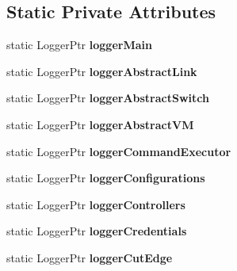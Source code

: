 \subsection*{\-Static \-Private \-Attributes}
\begin{DoxyCompactItemize}
\item 
\hypertarget{classLoggerFactory_a140eb1f15d32cba043a8dfeab472c0c7}{static \-Logger\-Ptr {\bfseries logger\-Main}}\label{classLoggerFactory_a140eb1f15d32cba043a8dfeab472c0c7}

\item 
\hypertarget{classLoggerFactory_a7ed5437cf20835f7321e23c51b7eaeff}{static \-Logger\-Ptr {\bfseries logger\-Abstract\-Link}}\label{classLoggerFactory_a7ed5437cf20835f7321e23c51b7eaeff}

\item 
\hypertarget{classLoggerFactory_a9b5c375d863f92de378d77d36909ddf2}{static \-Logger\-Ptr {\bfseries logger\-Abstract\-Switch}}\label{classLoggerFactory_a9b5c375d863f92de378d77d36909ddf2}

\item 
\hypertarget{classLoggerFactory_a1408937c0cef19d5899f7bd27c898d68}{static \-Logger\-Ptr {\bfseries logger\-Abstract\-V\-M}}\label{classLoggerFactory_a1408937c0cef19d5899f7bd27c898d68}

\item 
\hypertarget{classLoggerFactory_af3c920bdf909afa9901164bbfa2916fb}{static \-Logger\-Ptr {\bfseries logger\-Command\-Executor}}\label{classLoggerFactory_af3c920bdf909afa9901164bbfa2916fb}

\item 
\hypertarget{classLoggerFactory_a0a196c3529fc4a880213a0292b7b07fa}{static \-Logger\-Ptr {\bfseries logger\-Configurations}}\label{classLoggerFactory_a0a196c3529fc4a880213a0292b7b07fa}

\item 
\hypertarget{classLoggerFactory_a3fb6ec36c9583ecb848811197a9c9b32}{static \-Logger\-Ptr {\bfseries logger\-Controllers}}\label{classLoggerFactory_a3fb6ec36c9583ecb848811197a9c9b32}

\item 
\hypertarget{classLoggerFactory_add892f4f02ba8a547cd7fe582fc86848}{static \-Logger\-Ptr {\bfseries logger\-Credentials}}\label{classLoggerFactory_add892f4f02ba8a547cd7fe582fc86848}

\item 
\hypertarget{classLoggerFactory_a632e0228f925186885f1d507919a7767}{static \-Logger\-Ptr {\bfseries logger\-Cut\-Edge}}\label{classLoggerFactory_a632e0228f925186885f1d507919a7767}


\end{DoxyCompactItemize}
